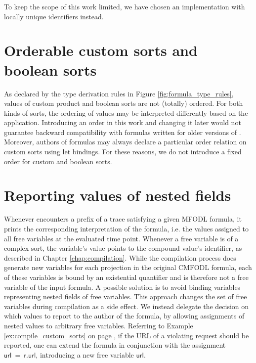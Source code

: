 To keep the scope of this work limited, we have chosen an implementation with locally unique identifiers instead.

\section{Orderable custom sorts and boolean sorts}
As declared by the type derivation rules in Figure \ref{fig:formula_type_rules}, values of custom product and boolean sorts are not (totally) ordered. For both kinds of sorts, the ordering of values may be interpreted differently based on the application. Introducing an order in this work and changing it later would not guarantee backward compatibility with formulas written for older versions of \MonPolyN. Moreover, authors of formulas may always declare a particular order relation on custom sorts using let bindings. For these reasons, we do not introduce a fixed order for custom and boolean sorts.

\section{Reporting values of nested fields}
Whenever \MonPoly encounters a prefix of a trace satisfying a given MFODL formula, it prints the corresponding interpretation of the formula, i.e. the values assigned to all free variables at the evaluated time point. Whenever a free variable is of a complex sort, the variable's value points to the compound value's identifier, as described in Chapter \ref{chap:compilation}. While the compilation process does generate new variables for each projection in the original CMFODL formula, each of these variables is bound by an existential quantifier and is therefore not a free variable of the input formula. A possible solution is to avoid binding variables representing nested fields of free variables. This approach changes the set of free variables during compilation as a side effect. We instead delegate the decision on which values to report to the author of the formula, by allowing assignments of nested values to arbitrary free variables. Referring to Example \ref{ex:compile_custom_sorts} on page \pageref{ex:compile_custom_sorts}, if the URL of a violating request should be reported, one can extend the formula in conjunction with the assignment $\mathsf{url\ =\ r.url}$, introducing a new free variable $\mathsf{url}$.

